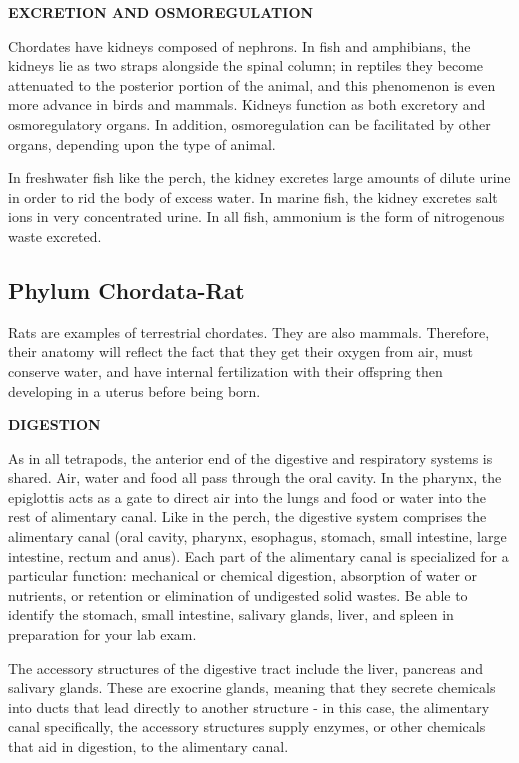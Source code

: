 \documentclass[
]{book}
\begin{document}
\textbf{EXCRETION AND OSMOREGULATION}

Chordates have kidneys composed of nephrons. In fish and amphibians, the kidneys lie as two straps alongside the spinal column; in reptiles they become attenuated to the posterior portion of the animal, and this phenomenon is even more advance in birds and mammals. Kidneys function as both excretory and osmoregulatory organs. In addition, osmoregulation can be facilitated by other organs, depending upon the type of animal.

In freshwater fish like the perch, the kidney excretes large amounts of dilute urine in order to rid the body of excess water. In marine fish, the kidney excretes salt ions in very concentrated urine.
In all fish, ammonium is the form of nitrogenous waste excreted.

\hypertarget{phylum-chordata-rat}{%
\subsection*{Phylum Chordata-Rat}\label{phylum-chordata-rat}}

Rats are examples of terrestrial chordates. They are also mammals. Therefore, their anatomy will reflect the fact that they get their oxygen from air, must conserve water, and have internal fertilization with their offspring then developing in a uterus before being born.

\textbf{DIGESTION}

As in all tetrapods, the anterior end of the digestive and respiratory systems is shared. Air, water and food all pass through the oral cavity. In the pharynx, the epiglottis acts as a gate to direct air into the lungs and food or water into the rest of alimentary canal. Like in the perch, the digestive
system comprises the alimentary canal (oral cavity, pharynx, esophagus, stomach, small intestine, large intestine, rectum and anus). Each part of the alimentary canal is specialized for a particular function: mechanical or chemical digestion, absorption of water or nutrients, or retention or elimination of undigested solid wastes. Be able to identify the stomach, small intestine, salivary glands, liver, and spleen in preparation for your lab exam.

The accessory structures of the digestive tract include the liver, pancreas and salivary glands. These are exocrine glands, meaning that they secrete chemicals into ducts that lead directly to another structure - in this case, the alimentary canal specifically, the accessory structures supply enzymes, or other chemicals that aid in digestion, to the alimentary canal.
\end{document}
